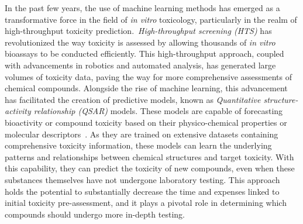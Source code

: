 In the past few years, the use of machine learning methods has emerged as a transformative force in the field of \emph{in vitro} toxicology, particularly in the realm of high-throughput toxicity prediction.~\emph{High-throughput screening (HTS)} has revolutionized the way toxicity is assessed by allowing thousands of \emph{in vitro} bioassays to be conducted efficiently. This high-throughput approach, coupled with advancements in robotics and automated analysis, has generated large volumes of toxicity data, paving the way for more comprehensive assessments of chemical compounds.
Alongside the rise of machine learning, this advancement has facilitated the creation of predictive models, known as \emph{Quantitative structure-activity relationship (QSAR)} models. These models are capable of forecasting bioactivity or compound toxicity based on their physico-chemical properties or molecular descriptors~\cite{banerjee2018}. As they are trained on extensive datasets containing comprehensive toxicity information, these models can learn the underlying patterns and relationships between chemical structures and target toxicity. With this capability, they can predict the toxicity of new compounds, even when these substances themselves have not undergone laboratory testing. This approach holds the potential to substantially decrease the time and expenses linked to initial toxicity pre-assessment, and it plays a pivotal role in determining which compounds should undergo more in-depth testing.

